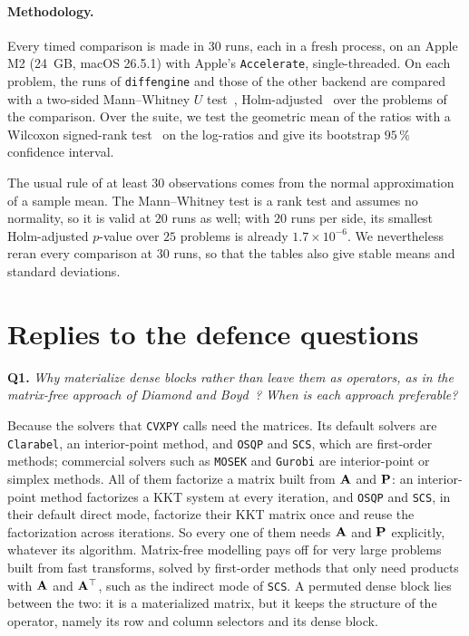 \documentclass[letterpaper,12pt]{article}
\newcommand{\question}[2]{\FloatBarrier\par\bigskip\textbf{Q#1.} \emph{#2}\par}
\begin{document}
\paragraph{Methodology.}
Every timed comparison is made in $30$ runs, each in a fresh process, on an Apple M2 (24~GB,
macOS 26.5.1) with Apple's \texttt{Accelerate}, single-threaded. On each problem, the runs of
\texttt{diffengine} and those of the other backend are compared with a two-sided Mann--Whitney
$U$ test~\cite{mann1947}, Holm-adjusted~\cite{holm1979} over the problems of the comparison. Over
the suite, we test the geometric mean of the ratios with a Wilcoxon signed-rank
test~\cite{wilcoxon1945} on the log-ratios and give its bootstrap $95\,\%$ confidence interval.

The usual rule of at least $30$ observations comes from the normal approximation of a sample
mean. The Mann--Whitney test is a rank test and assumes no normality, so it is valid at $20$
runs as well; with $20$ runs per side, its smallest Holm-adjusted $p$-value over $25$ problems
is already $1.7 \times 10^{-6}$. We nevertheless reran every comparison at $30$ runs, so that
the tables also give stable means and standard deviations.

\section{Replies to the defence questions}\label{sec:replies}

\question{1}{Why materialize dense blocks rather than leave them as operators, as in the
matrix-free approach of Diamond and Boyd~\cite{diamond2016matrixfree}? When is each approach
preferable?}
Because the solvers that \texttt{CVXPY} calls need the matrices. Its default solvers are
\texttt{Clarabel}, an interior-point method, and \texttt{OSQP} and \texttt{SCS}, which are
first-order methods; commercial solvers such as \texttt{MOSEK} and \texttt{Gurobi} are
interior-point or simplex methods. All of them factorize a matrix built from $\mathbf{A}$ and
$\mathbf{P}$: an interior-point method factorizes a KKT system at every iteration, and
\texttt{OSQP} and \texttt{SCS}, in their default direct mode, factorize their KKT matrix once and
reuse the factorization across iterations. So every one of them needs $\mathbf{A}$ and $\mathbf{P}$ explicitly,
whatever its algorithm. Matrix-free modelling pays off for very large problems built from fast
transforms, solved by first-order methods that only need products with $\mathbf{A}$ and
$\mathbf{A}^\top$, such as the indirect mode of \texttt{SCS}. A permuted dense block lies between
the two: it is a materialized matrix, but it keeps the structure of the operator, namely its
row and column selectors and its dense block.
\end{document}

